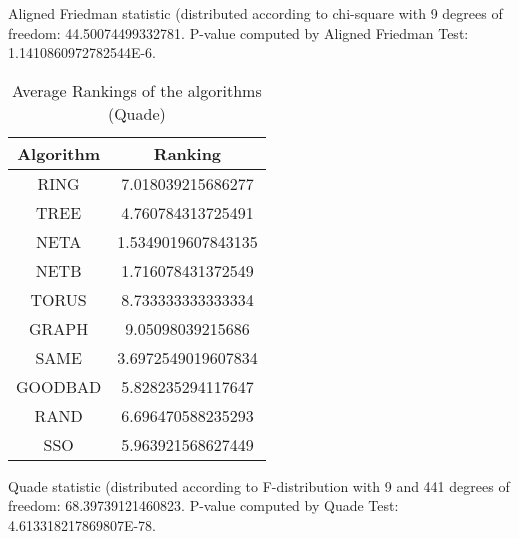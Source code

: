\documentclass[a4paper,10pt]{article}
\begin{document}
\begin{landscape}
Aligned Friedman statistic (distributed according to chi-square with 9 degrees of freedom: 44.50074499332781. 
P-value computed by Aligned Friedman Test: 1.1410860972782544E-6.\newline


\newpage

\begin{table}[!htp]
\centering
\caption{Average Rankings of the algorithms (Quade)
}\begin{tabular}{c|c}
Algorithm&Ranking\\
\hline
 RING&7.018039215686277\\
 TREE&4.760784313725491\\
 NETA&1.5349019607843135\\
 NETB&1.716078431372549\\
 TORUS&8.733333333333334\\
 GRAPH&9.05098039215686\\
 SAME&3.6972549019607834\\
 GOODBAD&5.828235294117647\\
 RAND&6.696470588235293\\
 SSO&5.963921568627449\\
\end{tabular}
\end{table}
Quade statistic (distributed according to F-distribution with 9 and 441 degrees of freedom: 68.39739121460823. 
P-value computed by Quade Test: 4.613318217869807E-78.\newline


\newpage


\end{landscape}
\end{document}

